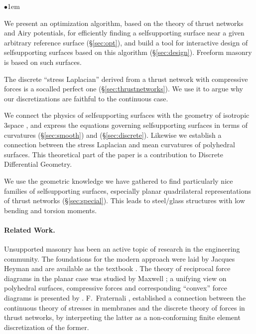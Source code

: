 \documentclass[review]{acmsiggraph}
\newcommand{\secref}[1]{(\S\ref{#1})}
\begin{document}
\begin{list}{$\bullet$}{\itemindent1em}

\item We present an optimization algorithm, based on the theory of
thrust networks and Airy potentials, for efficiently finding a
self\dash supporting surface near a given arbitrary reference surface
\secref{sec:opt}, and build a tool for interactive design of
self\dash supporting surfaces based on this algorithm \secref{sec:design}.
Freeform masonry is based on such surfaces.

\item The discrete ``stress Laplacian''
derived from a thrust network with compressive
forces is a so\dash called perfect one \secref{sec:thrustnetworks}.
We use it to argue why our discretizations are 
faithful to the continuous case.

\item We connect the physics of self\dash supporting surfaces with
the geometry of isotropic 3\dash space , and express the
equations governing self\dash supporting surfaces in terms of curvatures
\secref{sec:smooth} and \secref{sec:discrete}.
Likewise we establish a connection between the stress Laplacian and
mean curvatures of polyhedral surfaces. This theoretical part of the
paper is a contribution to Discrete Differential Geometry.


\item We use the geometric knowledge we have gathered to 
find particularly nice families of self\dash supporting surfaces,
especially planar quadrilateral representations of thrust networks
\secref{sec:special}. This leads to steel\slash glass structures
with low bending and torsion moments.

\end{list}


\paragraph{Related Work.}

Unsupported masonry has been an active topic of research in the
engineering community. The foundations for the modern approach were laid
by Jacques Heyman  and are available as the textbook
\cite{Heyman95}. The theory of reciprocal force diagrams in the planar
case was studied by Maxwell \cite{Maxwell64};
a unifying view on polyhedral surfaces, compressive
forces and corresponding ``convex'' force diagrams is presented by
\cite{Ash1988}. F.~Fraternali ,
 established a connection between the continuous
theory of stresses in membranes and the discrete theory of forces in
thrust networks, by interpreting the latter as a non-conforming
finite element discretization of the former.
\end{document}
